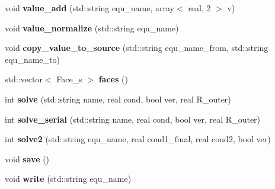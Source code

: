 \begin{DoxyCompactItemize}
\item 
\hypertarget{classProb_a8dd6bf7649956711e74ccc58957186d8}{void {\bfseries value\-\_\-add} (std\-::string equ\-\_\-name, array$<$ real, 2 $>$ v)}\label{classProb_a8dd6bf7649956711e74ccc58957186d8}

\item 
\hypertarget{classProb_ad0c1ce9a1ffc181bf289aed404a2bb45}{void {\bfseries value\-\_\-normalize} (std\-::string equ\-\_\-name)}\label{classProb_ad0c1ce9a1ffc181bf289aed404a2bb45}

\item 
\hypertarget{classProb_a7bb25a9a766484c678d7e23e4b5ea4a7}{void {\bfseries copy\-\_\-value\-\_\-to\-\_\-source} (std\-::string equ\-\_\-name\-\_\-from, std\-::string equ\-\_\-name\-\_\-to)}\label{classProb_a7bb25a9a766484c678d7e23e4b5ea4a7}

\item 
\hypertarget{classProb_ac298114d98ebe5296ede77dafc3f4df3}{std\-::vector$<$ Face\-\_\-s $>$ {\bfseries faces} ()}\label{classProb_ac298114d98ebe5296ede77dafc3f4df3}

\item 
\hypertarget{classProb_a7224056a4b6649080d3e2deeab2faaad}{int {\bfseries solve} (std\-::string name, real cond, bool ver, real R\-\_\-outer)}\label{classProb_a7224056a4b6649080d3e2deeab2faaad}

\item 
\hypertarget{classProb_a2485482a64a7f4f3d7ef75ba3a4687b0}{int {\bfseries solve\-\_\-serial} (std\-::string name, real cond, bool ver, real R\-\_\-outer)}\label{classProb_a2485482a64a7f4f3d7ef75ba3a4687b0}

\item 
\hypertarget{classProb_ae50c9b74ff1590305dac1e64988a6d8b}{int {\bfseries solve2} (std\-::string equ\-\_\-name, real cond1\-\_\-final, real cond2, bool ver)}\label{classProb_ae50c9b74ff1590305dac1e64988a6d8b}

\item 
\hypertarget{classProb_a187e846a4f4eed21758efaa63ede9ec1}{void {\bfseries save} ()}\label{classProb_a187e846a4f4eed21758efaa63ede9ec1}

\item 
\hypertarget{classProb_ad790058d97221b21c665d550650c15ad}{void {\bfseries write} (std\-::string equ\-\_\-name)}\label{classProb_ad790058d97221b21c665d550650c15ad}

\end{DoxyCompactItemize}

